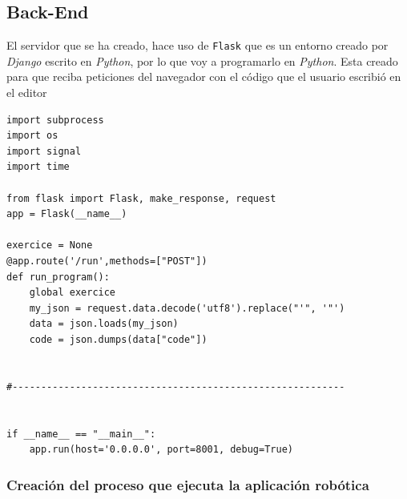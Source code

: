 \subsection{Back-End}
El servidor que se ha creado, hace uso de \texttt{Flask} que es un entorno creado por \textit{Django} escrito en \textit{Python}, por lo que voy a programarlo en \textit{Python}. Esta creado para que reciba peticiones del navegador con el código que el usuario escribió en el editor



\begin{lstlisting}[frame=single,breaklines=true, label=Extracción del código en el servidor Flask, caption=Extracción del código en el servidor Flask,  captionpos=b]
import subprocess
import os
import signal
import time

from flask import Flask, make_response, request
app = Flask(__name__)   

exercice = None
@app.route('/run',methods=["POST"])
def run_program():
    global exercice
	my_json = request.data.decode('utf8').replace("'", '"')
    data = json.loads(my_json)
    code = json.dumps(data["code"])
    
    
#----------------------------------------------------------


if __name__ == "__main__":
    app.run(host='0.0.0.0', port=8001, debug=True)
\end{lstlisting}

\subsubsection{Creación del proceso que ejecuta la aplicación robótica}

